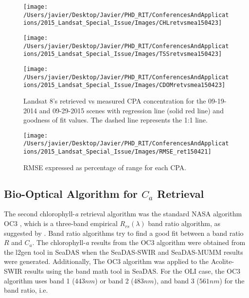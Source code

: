 \begin{figure}[htb]
  \begin{minipage}[c]{0.32\linewidth}
      \texttt{[image: /Users/javier/Desktop/Javier/PHD\_RIT/ConferencesAndApplications/2015\_Landsat\_Special\_Issue/Images/CHLretvsmea150423]}  
  \end{minipage}
  \begin{minipage}[d]{0.32\linewidth}
      \texttt{[image: /Users/javier/Desktop/Javier/PHD\_RIT/ConferencesAndApplications/2015\_Landsat\_Special\_Issue/Images/TSSretvsmea150423]}
  \end{minipage}
  \begin{minipage}[c]{0.32\linewidth}
      \texttt{[image: /Users/javier/Desktop/Javier/PHD\_RIT/ConferencesAndApplications/2015\_Landsat\_Special\_Issue/Images/CDOMretvsmea150423]}  
  \end{minipage}

  \caption{Landsat 8's retrieved vs measured CPA concentration for the 09-19-2014 and 09-29-2015 scenes with regression line (solid red line) and goodness of fit values. The dashed line represents the 1:1 line. \label{fig:CPAsRetVSMea} } 
\end{figure}

\begin{figure}[htb]
  \centering
      \texttt{[image: /Users/javier/Desktop/Javier/PHD\_RIT/ConferencesAndApplications/2015\_Landsat\_Special\_Issue/Images/RMSE\_ret150421]}
      \caption{RMSE expressed as percentage of range for each CPA. \label{fig:RMSE}}
\end{figure}





\subsection{Bio-Optical Algorithm for $C_a$ Retrieval}
\label{subsec:bioopticalapproach}
The second chlorophyll-{\it a} retrieval algorithm was the standard NASA algorithm OC3 \cite{OReilly2000}, which is a three-band empirical $R_{rs}(\lambda)$ band ratio algorithm, as suggested by \cite{Franz:2015}. Band ratio algorithms try to find a good fit between a band ratio $R$ and $C_a$. The chlorophyll-{\it a} results from the OC3 algorithm were obtained from the l2gen tool in SeaDAS when the SeaDAS-SWIR and SeaDAS-MUMM results were generated. Additionally, The OC3 algorithm was applied to the Acolite-SWIR results using the band math tool in SeaDAS. For the OLI case, the OC3 algorithm uses band 1 ($443nm$) or band 2 ($483nm$), and band 3 ($561nm$) for the band ratio, i.e.

